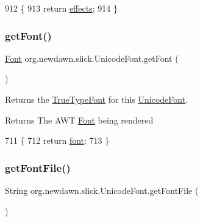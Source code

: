 \begin{DoxyCode}
912                               \{
913         \textcolor{keywordflow}{return} \mbox{\hyperlink{classorg_1_1newdawn_1_1slick_1_1_unicode_font_a57bc565e86127d8f7c0d7bcfa2f6dc56}{effects}};
914     \}
\end{DoxyCode}
\mbox{\label{classorg_1_1newdawn_1_1slick_1_1_unicode_font_a79b0d204d4dc075991bd0a3625722521}} 
\subsubsection{\texorpdfstring{get\+Font()}{getFont()}}
{\footnotesize\ttfamily \mbox{\hyperlink{interfaceorg_1_1newdawn_1_1slick_1_1_font}{Font}} org.\+newdawn.\+slick.\+Unicode\+Font.\+get\+Font (\begin{DoxyParamCaption}{ }\end{DoxyParamCaption})\hspace{0.3cm}{\ttfamily [inline]}}

Returns the \mbox{\hyperlink{classorg_1_1newdawn_1_1slick_1_1_true_type_font}{True\+Type\+Font}} for this \mbox{\hyperlink{classorg_1_1newdawn_1_1slick_1_1_unicode_font}{Unicode\+Font}}.

\begin{DoxyReturn}{Returns}
The A\+WT \mbox{\hyperlink{interfaceorg_1_1newdawn_1_1slick_1_1_font}{Font}} being rendered 
\end{DoxyReturn}

\begin{DoxyCode}
711                           \{
712         \textcolor{keywordflow}{return} \mbox{\hyperlink{classorg_1_1newdawn_1_1slick_1_1_unicode_font_a956ab491839be375d47444a67ebff11c}{font}};
713     \}
\end{DoxyCode}
\mbox{\label{classorg_1_1newdawn_1_1slick_1_1_unicode_font_a569a6742eb931a0d9d21a14ca7a0d7c4}} 
\subsubsection{\texorpdfstring{get\+Font\+File()}{getFontFile()}}
{\footnotesize\ttfamily String org.\+newdawn.\+slick.\+Unicode\+Font.\+get\+Font\+File (\begin{DoxyParamCaption}{ }\end{DoxyParamCaption})\hspace{0.3cm}{\ttfamily [inline]}}

